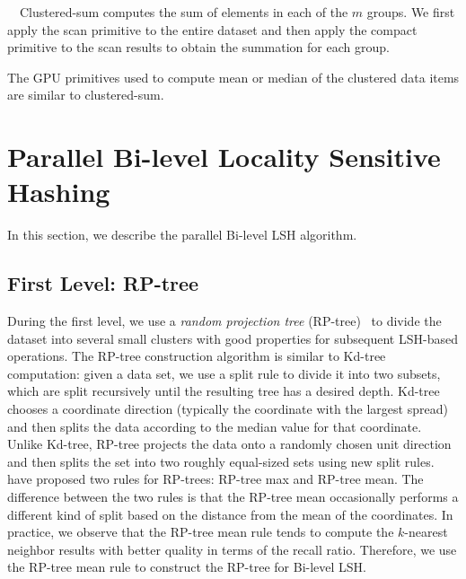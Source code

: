  \ \ Clustered-sum computes the sum of elements in each of the $m$ groups. We first apply the scan primitive to the entire dataset and then apply the compact primitive to the scan results to obtain the summation for each group.

\noindent {}

The GPU primitives used to compute mean or median of the clustered data items are similar to clustered-sum.


\section{Parallel Bi-level Locality Sensitive Hashing}
\label{sec:6:parallel}
In this section, we describe the parallel Bi-level LSH algorithm.

\subsection{First Level: RP-tree}
During the first level, we use a \emph{random projection tree} (RP-tree)~\cite{yoav:nips:2007,Dasgupta:2008} to divide the dataset into several small clusters with good properties for subsequent LSH-based operations. The RP-tree construction algorithm is similar to Kd-tree computation: given a data set, we use a split rule to divide it into two subsets, which are split recursively until the resulting tree has a desired depth. Kd-tree chooses a coordinate direction (typically the coordinate with the largest spread) and then splits the data according to the median value for that coordinate. Unlike Kd-tree, RP-tree projects the data onto a randomly chosen unit direction and then splits the set into two roughly equal-sized sets using new split rules. \cite{Dasgupta:2008} have proposed two rules for RP-trees: RP-tree max and RP-tree mean. The difference between the two rules is that the RP-tree mean occasionally performs a different kind of split based on the distance from the mean of the coordinates. In practice, we observe that the RP-tree mean rule tends to compute the $k$-nearest neighbor results with better quality in terms of the recall ratio. Therefore, we use the RP-tree mean rule to construct the RP-tree for Bi-level LSH.

